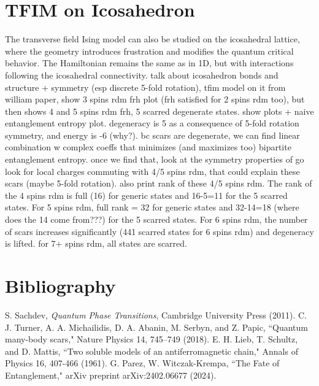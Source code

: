 \documentclass{article}
\begin{document}
\section{TFIM on Icosahedron}
The transverse field Ising model can also be studied on the icosahedral lattice, where the geometry introduces frustration and modifies the quantum critical behavior. The Hamiltonian remains the same as in 1D, but with interactions following the icosahedral connectivity. talk about icosahedron bonds  and structure + symmetry (esp discrete 5-fold rotation), tfim model on it from william paper, show 3 spins rdm frh plot (frh satisfied for  2 spins rdm too), but then shows 4 and 5 spins rdm frh, 5 scarred degenerate states. show plots + naive entanglement entropy plot. degeneracy is 5 as a consequence of 5-fold rotation symmetry, and energy is -6 (why?). bc scars are  degenerate, we can find linear combination w complex coeffs that minimizes (and maximizes too) bipartite entanglement entropy. once we find that, look at the symmetry properties of  go look for local charges commuting with 4/5 spins rdm, that could explain these scars (maybe 5-fold rotation). also print rank of these 4/5 spins rdm. The rank of the 4 spins rdm is full (16) for generic states and 16-5=11 for the 5 scarred states. For 5 spins rdm, full rank = 32 for generic states and 32-14=18 (where does the 14 come from???) for the 5 scarred states. For 6 spins rdm, the number of scars increases significantly (441 scarred states for 6 spins rdm) and degeneracy is lifted. for 7+ spins rdm, all states are scarred.

\section*{Bibliography}
\begin{thebibliography}{9}
     S. Sachdev, \textit{Quantum Phase Transitions}, Cambridge University Press (2011).
     C. J. Turner, A. A. Michailidis, D. A. Abanin, M. Serbyn, and Z. Papic, ``Quantum many-body scars," Nature Physics 14, 745–749 (2018).
     E. H. Lieb, T. Schultz, and D. Mattis, ``Two soluble models of an antiferromagnetic chain," Annals of Physics 16, 407-466 (1961).
     G. Parez, W. Witczak-Krempa, ``The Fate of Entanglement," arXiv preprint arXiv:2402.06677 (2024).
\end{thebibliography}
\end{document}
